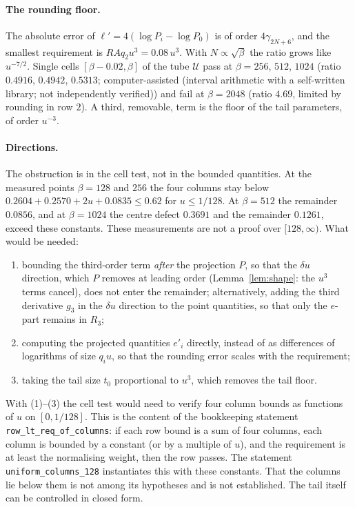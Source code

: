 \documentclass[11pt,a4paper]{article}
\theoremstyle{definition}
\theoremstyle{remark}
\newcommand{\code}[1]{\texttt{#1}}
\newcommand{\cU}{\mathcal{U}}
\newcommand{\IA}{computer-assisted (interval arithmetic with a self-written library; not independently verified)}
\begin{document}
\paragraph{The rounding floor.}
The absolute error of $\ell'=4(\log P_i-\log P_0)$ is of order $4\gamma_{2N+6}$, and the smallest requirement is $RAq_2u^3=0.08\,u^3$.
With $N\propto\sqrt\beta$ the ratio grows like $u^{-7/2}$.
Single cells $[\beta-0.02,\beta]$ of the tube $\cU$ pass at $\beta=256$, $512$, $1024$ (ratio $0.4916$, $0.4942$, $0.5313$; \IA) and fail at $\beta=2048$ (ratio $4.69$, limited by rounding in row $2$).
A third, removable, term is the floor of the tail parameters, of order $u^{-3}$.

\paragraph{Directions.}
The obstruction is in the cell test, not in the bounded quantities.
At the measured points $\beta=128$ and $256$ the four columns stay below $0.2604+0.2570+2u+0.0835\le0.62$ for $u\le1/128$.
At $\beta=512$ the remainder $0.0856$, and at $\beta=1024$ the centre defect $0.3691$ and the remainder $0.1261$, exceed these constants.
These measurements are not a proof over $[128,\infty)$.
What would be needed:
\begin{enumerate}[nosep]
\item bounding the third-order term \emph{after} the projection $P$, so that the $\delta u$ direction, which $P$ removes at leading order (Lemma~\ref{lem:shape}: the $u^3$ terms cancel), does not enter the remainder; alternatively, adding the third derivative $g_3$ in the $\delta u$ direction to the point quantities, so that only the $e$-part remains in $R_3$;
\item computing the projected quantities $e'_i$ directly, instead of as differences of logarithms of size $q_iu$, so that the rounding error scales with the requirement;
\item taking the tail size $t_0$ proportional to $u^3$, which removes the tail floor.
\end{enumerate}
With (1)--(3) the cell test would need to verify four column bounds as functions of $u$ on $[0,1/128]$.
This is the content of the bookkeeping statement \code{row\_lt\_req\_of\_columns}: if each row bound is a sum of four columns, each column is bounded by a constant (or by a multiple of $u$), and the requirement is at least the normalising weight, then the row passes.
The statement \code{uniform\_columns\_128} instantiates this with these constants.
That the columns lie below them is not among its hypotheses and is not established.
The tail itself can be controlled in closed form.
\end{document}
